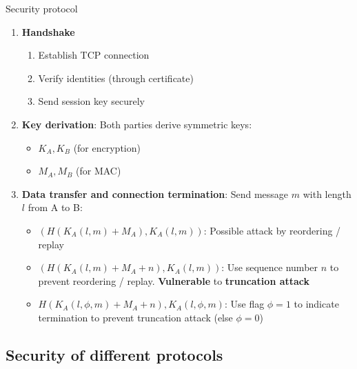 \begin{theorem}
    {Security protocol}
    \begin{enumerate}
        \item \textbf{Handshake}
              \begin{enumerate}
                  \item Establish TCP connection
                  \item Verify identities (through certificate)
                  \item Send session key securely
              \end{enumerate}
        \item \textbf{Key derivation}: Both parties derive symmetric keys:
              \begin{itemize}
                  \item $K_A, K_B$ (for encryption)
                  \item $M_A, M_B$ (for MAC)
              \end{itemize}
        \item \textbf{Data transfer and connection termination}: Send message $m$ with length $l$ from A to B:
              \begin{itemize}
                  \item $(H(K_A(l,m) + M_A), K_A(l,m))$: Possible attack by reordering / replay
                  \item $(H(K_A(l,m) + M_A + n), K_A(l,m))$: Use sequence number $n$ to prevent reordering / replay. \textbf{Vulnerable} to \textbf{truncation attack}
                  \item $H(K_A(l,\phi,m)+M_A+n),K_A(l,\phi,m)$: Use flag $\phi=1$ to indicate termination to prevent truncation attack (else $\phi=0$)
              \end{itemize}
    \end{enumerate}
\end{theorem}




\subsection{Security of different protocols}

